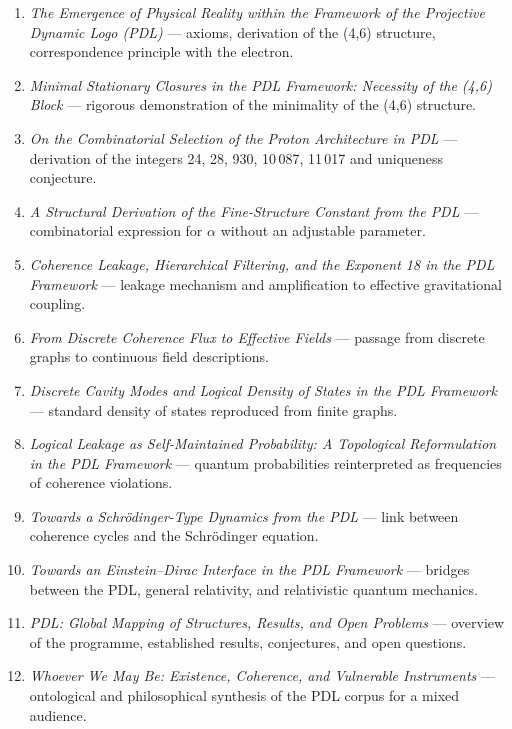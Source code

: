 \documentclass[11pt, a4paper, openright]{book}
\begin{document}
\begin{enumerate}

\item \textit{The Emergence of Physical Reality within the Framework of the Projective Dynamic Logo (PDL)} — axioms, derivation of the (4,6) structure, correspondence principle with the electron.

\item \textit{Minimal Stationary Closures in the PDL Framework: Necessity of the (4,6) Block} — rigorous demonstration of the minimality of the (4,6) structure.

\item \textit{On the Combinatorial Selection of the Proton Architecture in PDL} — derivation of the integers 24, 28, 930, 10\,087, 11\,017 and uniqueness conjecture.

\item \textit{A Structural Derivation of the Fine-Structure Constant from the PDL} — combinatorial expression for $\alpha$ without an adjustable parameter.

\item \textit{Coherence Leakage, Hierarchical Filtering, and the Exponent 18 in the PDL Framework} — leakage mechanism and amplification to effective gravitational coupling.

\item \textit{From Discrete Coherence Flux to Effective Fields} — passage from discrete graphs to continuous field descriptions.

\item \textit{Discrete Cavity Modes and Logical Density of States in the PDL Framework} — standard density of states reproduced from finite graphs.

\item \textit{Logical Leakage as Self-Maintained Probability: A Topological Reformulation in the PDL Framework} — quantum probabilities reinterpreted as frequencies of coherence violations.

\item \textit{Towards a Schrödinger-Type Dynamics from the PDL} — link between coherence cycles and the Schrödinger equation.

\item \textit{Towards an Einstein--Dirac Interface in the PDL Framework} — bridges between the PDL, general relativity, and relativistic quantum mechanics.

\item \textit{PDL: Global Mapping of Structures, Results, and Open Problems} — overview of the programme, established results, conjectures, and open questions.

\item \textit{Whoever We May Be: Existence, Coherence, and Vulnerable Instruments} — ontological and philosophical synthesis of the PDL corpus for a mixed audience.

\end{enumerate}

\end{document}
